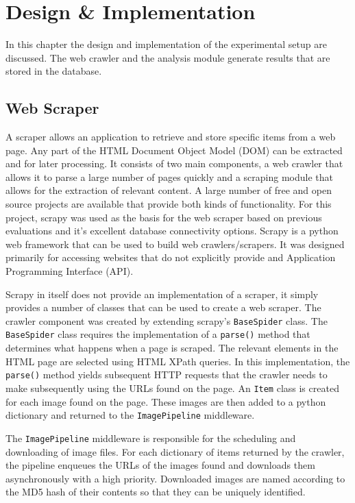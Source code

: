 \chapter{Design \& Implementation}
\label{ch:dev}
In this chapter the design and implementation of the experimental setup are discussed. The web crawler and the analysis module generate results that are stored in the database.
\section {Web Scraper}
\label{sec:scraper}
A scraper allows an application to retrieve and store specific items from a web page. Any part of the HTML Document Object Model (DOM) can be extracted and for later processing. It consists of two main components, a web crawler that allows it to parse a large number of pages quickly and a scraping module that allows for the extraction of relevant content. A large number of free and open source projects are available that provide both kinds of functionality. For this project, scrapy was used as the basis for the web scraper based on previous evaluations and it's excellent database connectivity options. Scrapy is a python web framework that can be used to build web crawlers/scrapers. It was designed primarily for accessing websites that do not explicitly provide and Application Programming Interface (API).
\par Scrapy in itself does not provide an implementation of a scraper, it simply provides a number of classes that can be used to create a web scraper. The crawler component was created by extending scrapy's \texttt{BaseSpider} class. The \texttt{BaseSpider} class requires the implementation of a \texttt{parse()} method that determines what happens when a page is scraped. The relevant elements in the HTML page are selected using HTML XPath queries. In this implementation, the \texttt{parse()} method yields subsequent HTTP requests that the crawler needs to make subsequently using the URLs found on the page. An \texttt{Item} class is created for each image found on the page. These images are then added to a python dictionary and returned to the \texttt{ImagePipeline} middleware.
\par The \texttt{ImagePipeline} middleware is responsible for the scheduling and downloading of image files. For each dictionary of items returned by the crawler, the pipeline enqueues the URLs of the images found and downloads them asynchronously with a high priority. Downloaded images are named according to the MD5 hash of their contents so that they can be uniquely identified. 
